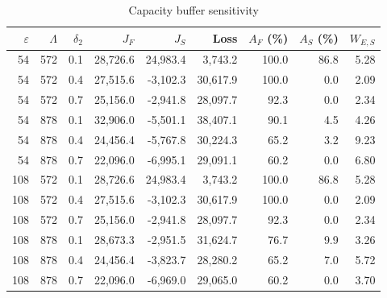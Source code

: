 \begin{table}[H]
\centering\footnotesize
\caption{Capacity buffer sensitivity}\label{tab:reserve}
\begin{tabular}{@{}rrrrrrrrr@{}}\toprule
$\varepsilon$ & $\Lambda$ & $\delta_2$ & $J_F$ & $J_S$ & Loss & $A_F$ (\%) & $A_S$ (\%) & $W_{E,S}$\\\midrule
54 & 572 & 0.1 & 28,726.6 & 24,983.4 & 3,743.2 & 100.0 & 86.8 & 5.28\\
54 & 572 & 0.4 & 27,515.6 & -3,102.3 & 30,617.9 & 100.0 & 0.0 & 2.09\\
54 & 572 & 0.7 & 25,156.0 & -2,941.8 & 28,097.7 & 92.3 & 0.0 & 2.34\\
54 & 878 & 0.1 & 32,906.0 & -5,501.1 & 38,407.1 & 90.1 & 4.5 & 4.26\\
54 & 878 & 0.4 & 24,456.4 & -5,767.8 & 30,224.3 & 65.2 & 3.2 & 9.23\\
54 & 878 & 0.7 & 22,096.0 & -6,995.1 & 29,091.1 & 60.2 & 0.0 & 6.80\\
108 & 572 & 0.1 & 28,726.6 & 24,983.4 & 3,743.2 & 100.0 & 86.8 & 5.28\\
108 & 572 & 0.4 & 27,515.6 & -3,102.3 & 30,617.9 & 100.0 & 0.0 & 2.09\\
108 & 572 & 0.7 & 25,156.0 & -2,941.8 & 28,097.7 & 92.3 & 0.0 & 2.34\\
108 & 878 & 0.1 & 28,673.3 & -2,951.5 & 31,624.7 & 76.7 & 9.9 & 3.26\\
108 & 878 & 0.4 & 24,456.4 & -3,823.7 & 28,280.2 & 65.2 & 7.0 & 5.72\\
108 & 878 & 0.7 & 22,096.0 & -6,969.0 & 29,065.0 & 60.2 & 0.0 & 3.70\\
\bottomrule\end{tabular}
\end{table}
